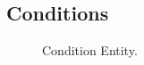 %
%
%
%
%

\subsection{Conditions}\label{sec:conditions}

\begin{figure}[h]
	\begin{center}
	\end{center}
	\caption{Condition Entity.}\label{fig:condition_entity}
\end{figure}

